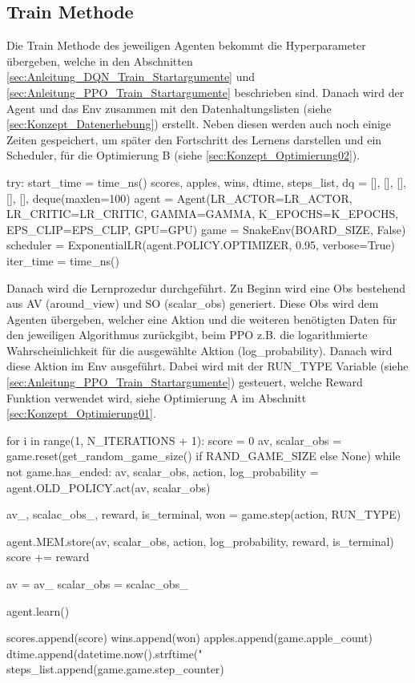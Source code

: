 \subsection{Train Methode}
Die Train Methode des jeweiligen Agenten bekommt die Hyperparameter übergeben, welche in den Abschnitten \ref{sec:Anleitung_DQN_Train_Startargumente} und \ref{sec:Anleitung_PPO_Train_Startargumente} beschrieben sind.
Danach wird der Agent und das Env zusammen mit den Datenhaltungslisten (siehe \ref{sec:Konzept_Datenerhebung}) erstellt. Neben diesen werden auch noch einige Zeiten gespeichert, um später den Fortschritt des Lernens darstellen und ein Scheduler, für die Optimierung B (siehe \ref{sec:Konzept_Optimierung02}).
\begin{python}
	try:
		start_time = time_ns()
		scores, apples, wins, dtime, steps_list, dq = [], [], [], [], [], deque(maxlen=100)
		agent = Agent(LR_ACTOR=LR_ACTOR, LR_CRITIC=LR_CRITIC, GAMMA=GAMMA, K_EPOCHS=K_EPOCHS, EPS_CLIP=EPS_CLIP,
		GPU=GPU)
		game = SnakeEnv(BOARD_SIZE, False)
		scheduler = ExponentialLR(agent.POLICY.OPTIMIZER, 0.95, verbose=True)
		iter_time = time_ns()
\end{python}
Danach wird die Lernprozedur durchgeführt. Zu Beginn wird eine Obs bestehend aus AV (around\_view) und SO (scalar\_obs) generiert. Diese Obs wird dem Agenten übergeben, welcher eine Aktion und die weiteren benötigten Daten für den jeweiligen Algorithmus zurückgibt, beim PPO z.B. die logarithmierte Wahrscheinlichkeit für die ausgewählte Aktion (log\_probability). Danach wird diese Aktion im Env ausgeführt. Dabei wird mit der RUN\_TYPE Variable (siehe \ref{sec:Anleitung_PPO_Train_Startargumente}) gesteuert, welche Reward Funktion verwendet wird, siehe Optimierung A im Abschnitt \ref{sec:Konzept_Optimierung01}.
\begin{python}
	for i in range(1, N_ITERATIONS + 1):
		score = 0
		av, scalar_obs = game.reset(get_random_game_size() if RAND_GAME_SIZE else None)
		while not game.has_ended:
			av, scalar_obs, action, log_probability = agent.OLD_POLICY.act(av, scalar_obs)
			
			av_, scalac_obs_, reward, is_terminal, won = game.step(action, RUN_TYPE)
			
			agent.MEM.store(av, scalar_obs, action, log_probability, reward, is_terminal)
			score += reward
			
			av = av_
			scalar_obs = scalac_obs_
		
		agent.learn()
		
		scores.append(score)
		wins.append(won)
		apples.append(game.apple_count)
		dtime.append(datetime.now().strftime("%
		steps_list.append(game.game.step_counter)
\end{python}
